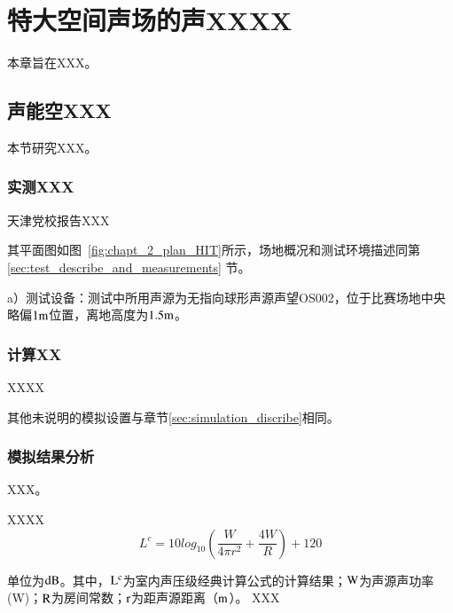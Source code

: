 
\chapter{特大空间声场的声XXXX}

本章旨在XXX。

\section{声能空XXX}

本节研究XXX。

\subsection{实测XXX}

天津党校报告XXX

 其平面图如图~\ref{fig:chapt_2_plan_HIT}所示，场地概况和测试环境描述同第\ref{sec:test_describe_and_measurements} 节。

a）测试设备：测试中所用声源为无指向球形声源声望OS002，位于比赛场地中央略偏$\rm 1m$位置，离地高度为$\rm 1.5m$。

\subsection{计算XX}

XXXX

其他未说明的模拟设置与章节\ref{sec:simulation_discribe}相同。


\subsection{模拟结果分析}

XXX。

XXXX
\begin{equation}
\label{classical_equation}
L^c=10log_{10}(\frac{W}{4{\pi}r^2}+\frac{4W}{R})+120
\end{equation}

单位为$\rm dB$。其中，$\rm L^c$为室内声压级经典计算公式的计算结果；$\rm W$为声源声功率(W)；$\rm R$为房间常数；$\rm r$为距声源距离（$\rm m$）。
XXX

